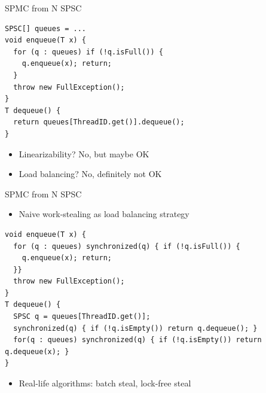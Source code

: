 \begin{frame}{SPMC from N SPSC}


\begin{verbatim}
SPSC[] queues = ...
void enqueue(T x) {
  for (q : queues) if (!q.isFull()) {
    q.enqueue(x); return;
  }
  throw new FullException();
}
T dequeue() {  
  return queues[ThreadID.get()].dequeue();  
}
\end{verbatim}

\begin{itemize}
  \item Linearizability? \pause No, but maybe OK
  \pause \item Load balancing? \pause No, definitely not OK      
\end{itemize}
\end{frame}

\begin{frame}{SPMC from N SPSC}

\begin{itemize}
  \item Naive work-stealing as load balancing strategy
\end{itemize}

\pause

\begin{verbatim}
void enqueue(T x) {
  for (q : queues) synchronized(q) { if (!q.isFull()) {
    q.enqueue(x); return;
  }}
  throw new FullException();
}
T dequeue() {  
  SPSC q = queues[ThreadID.get()];
  synchronized(q) { if (!q.isEmpty()) return q.dequeue(); }  
  for(q : queues) synchronized(q) { if (!q.isEmpty()) return q.dequeue(x); }
}
\end{verbatim}

\pause
\begin{itemize}
  \item Real-life algorithms: batch steal, lock-free steal
\end{itemize}

\end{frame}


